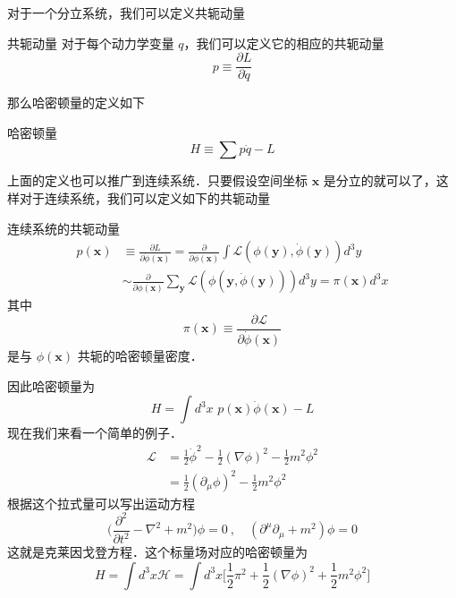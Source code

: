 对于一个分立系统，我们可以定义共轭动量
\begin{definition}{共轭动量}
对于每个动力学变量 $q$，我们可以定义它的相应的共轭动量
\begin{equation}
p \equiv \frac{\partial L}{\partial \dot q}
\end{equation}
\end{definition}
那么哈密顿量的定义如下
\begin{definition}{哈密顿量}
\begin{equation}\label{classi_eq1}
H \equiv \sum p \dot q - L
\end{equation}
\end{definition}
上面的定义也可以推广到连续系统．只要假设空间坐标 $\mathbf x$ 是分立的就可以了，这样对于连续系统，我们可以定义如下的共轭动量
\begin{definition}{连续系统的共轭动量}
\begin{equation}
\begin{aligned}
p(\mathbf x) & \equiv \frac{\partial L}{\partial \dot \phi(\mathbf x)} = \frac{\partial}{\partial \dot \phi(\mathbf x)} \int \mathcal L(\phi(\mathbf y),\dot \phi(\mathbf y)) d^3 y \\
& \sim \frac{\partial}{\partial \dot \phi(\mathbf x)} \sum_{\mathbf y} \mathcal L(\phi(\mathbf y,\dot \phi(\mathbf y))) d^3 y=\pi(\mathbf x) d^3 x
\end{aligned}
\end{equation}
其中
\begin{equation}
\pi(\mathbf x) \equiv \frac{\partial \mathcal L}{\partial \dot \phi(\mathbf x)}
\end{equation}
是与 $\phi(\mathbf x)$ 共轭的哈密顿量密度．
\end{definition}
因此哈密顿量为
\begin{equation}
H = \int d^3 x\,\, p(\mathbf x) \dot \phi(\mathbf x) - L
\end{equation}
现在我们来看一个简单的例子．
\begin{align}\nonumber
\mathcal L & = \frac{1}{2} \dot \phi^2 - \frac{1}{2} (\nabla \phi)^2 - \frac{1}{2} m^2 \phi^2 \\
& = \frac{1}{2} (\partial_\mu\phi)^2 - \frac{1}{2} m^2 \phi^2
\end{align}
根据这个拉式量可以写出运动方程
\begin{equation}
\bigg( \frac{\partial^2}{\partial t^2} - \nabla^2 +m^2 \bigg)\phi = 0~,\quad (\partial^\mu\partial_\mu+m^2)\phi = 0
\end{equation}
这就是克莱因戈登方程．这个标量场对应的哈密顿量为
\begin{equation}
H =  \int d^3x \mathcal H = \int d^3 x \bigg[ \frac{1}{2} \pi^2 + \frac{1}{2} (\nabla \phi)^2 + \frac{1}{2} m^2 \phi^2 \bigg] 
\end{equation} 

